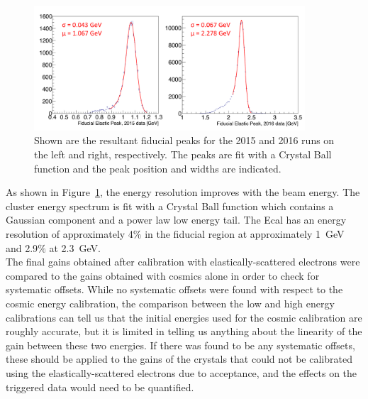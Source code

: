 \documentclass[12pt]{report}
\begin{document}
\begin{figure}[H]
  \centering
      \includegraphics[width=0.9\textwidth]{pics/performance/feePeakFid.png}
  \caption[Reconstructed elastic peak in the Ecal for 2015 and 2016 running]{Shown are the resultant fiducial peaks for the 2015 and 2016 runs on the left and right, respectively. The peaks are fit with a Crystal Ball function and the peak position and widths are indicated. }
  \label{Figure:FeeFidPeak}
\end{figure}

As shown in Figure~\ref{Figure:FeeFidPeak}, the energy resolution improves with the beam energy. The cluster energy spectrum is fit with a Crystal Ball function which contains a Gaussian component and a power law low energy tail. The Ecal has an energy resolution of approximately 4$\%$ in the fiducial region at approximately 1~GeV and 2.9$\%$ at 2.3~GeV. \\
\indent The final gains obtained after calibration with elastically-scattered electrons were compared to the gains obtained with cosmics alone in order to check for systematic offsets. While no systematic offsets were found with respect to the cosmic energy calibration, the comparison between the low and high energy calibrations can tell us that the initial energies used for the cosmic calibration are roughly accurate, but it is limited in telling us anything about the linearity of the gain between these two energies. If there was found to be any systematic offsets, these should be applied to the gains of the crystals that could not be calibrated using the elastically-scattered electrons due to acceptance, and the effects on the triggered data would need to be quantified. 

\end{document}
